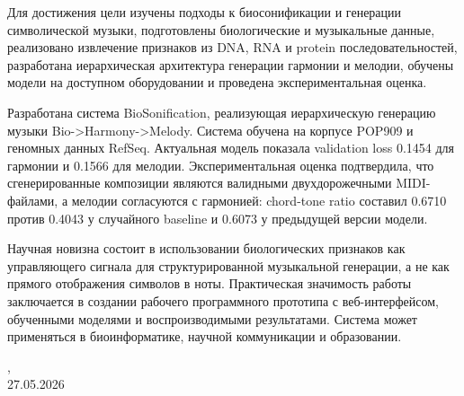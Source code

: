 \documentclass[a4paper, 12pt]{extreport}
\begin{document}
\begin{par}
Для достижения цели изучены подходы к биосонификации и генерации символической музыки, подготовлены биологические и музыкальные данные, реализовано извлечение признаков из DNA, RNA и protein последовательностей, разработана иерархическая архитектура генерации гармонии и мелодии, обучены модели на доступном оборудовании и проведена экспериментальная оценка.

Разработана система BioSonification, реализующая иерархическую генерацию музыки Bio->Harmony->Melody. Система обучена на корпусе POP909 и геномных данных RefSeq. Актуальная модель показала validation loss 0.1454 для гармонии и 0.1566 для мелодии. Экспериментальная оценка подтвердила, что сгенерированные композиции являются валидными двухдорожечными MIDI-файлами, а мелодии согласуются с гармонией: chord-tone ratio составил 0.6710 против 0.4043 у случайного baseline и 0.6073 у предыдущей версии модели.

Научная новизна состоит в использовании биологических признаков как управляющего сигнала для структурированной музыкальной генерации, а не как прямого отображения символов в ноты. Практическая значимость работы заключается в создании рабочего программного прототипа с веб-интерфейсом, обученными моделями и воспроизводимыми результатами. Система может применяться в биоинформатике, научной коммуникации и образовании.

\begin{flushleft}
    \vspace{1.02cm}
    \vfill
    \student, \\
    27.05.2026
\end{flushleft}

\end{par}
\end{document}
